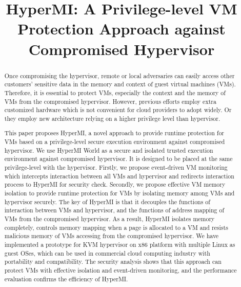 \documentclass[conference]{IEEEtran}
\begin{document}
\title{HyperMI: A Privilege-level VM Protection Approach against Compromised Hypervisor}

\maketitle



\begin{abstract}

Once compromising the hypervisor, remote or local adversaries can easily access other customers' sensitive data in the memory and context of guest virtual machines (VMs).
Therefore, it is essential to protect VMs, especially the context and the memory of VMs from the compromised hypervisor.
However, previous efforts employ extra customized hardware which is not convenient for cloud providers to adopt widely. Or they employ new architecture relying on a higher privilege level than hypervisor. 

This paper proposes HyperMI, a novel approach to provide runtime protection for VMs based on a privilege-level secure execution environment against compromised hypervisor. 
We use HyperMI World as a secure and isolated trusted execution environment against compromised hypervisor. 
It is designed to be placed at the same privilege-level with the hypervisor.
Firstly, we propose event-driven VM monitoring which intercepts interaction between all VMs and hypervisor and redirects interaction process to HyperMI for security check. Secondly, we propose effective VM memory isolation to provide runtime protection for VMs by isolating memory among VMs and hypervisor securely. 
The key of HyperMI is that it decouples the functions of interaction between VMs and hypervisor, and the functions of address mapping of VMs from the compromised hypervisor. As a result, HyperMI isolates memory completely, controls memory mapping when a page is allocated to a VM and resists malicious memory of VMs accessing from the compromised hypervisor.
We have implemented a prototype for KVM hypervisor on x86 platform with multiple Linux as guest OSes, which can be used in commercial cloud computing industry with portability and compatibility. The security analysis shows that this approach can protect VMs with effective isolation and event-driven monitoring, and the performance evaluation confirms the efficiency of HyperMI.




\end{abstract}
\end{document}
